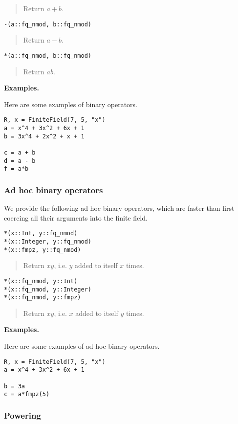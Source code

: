 \documentclass[a4paper,10pt]{article}
\newcommand{\desc}[1]{\vspace{-3mm}\begin{quote}#1\end{quote}}
\begin{document}
{{\desc{Return $a + b$.}

\begin{lstlisting}
-(a::fq_nmod, b::fq_nmod)
\end{lstlisting}

\desc{Return $a - b$.}

\begin{lstlisting}
*(a::fq_nmod, b::fq_nmod)
\end{lstlisting}

\desc{Return $ab$.}

\textbf{Examples.}

Here are some examples of binary operators.

\begin{lstlisting}
R, x = FiniteField(7, 5, "x")
a = x^4 + 3x^2 + 6x + 1
b = 3x^4 + 2x^2 + x + 1

c = a + b
d = a - b
f = a*b
\end{lstlisting}

\subsubsection{Ad hoc binary operators}

We provide the following ad hoc binary operators, which are faster than first
coercing all their arguments into the finite field.

\begin{lstlisting}
*(x::Int, y::fq_nmod)
*(x::Integer, y::fq_nmod)
*(x::fmpz, y::fq_nmod)
\end{lstlisting}

\desc{Return $xy$, i.e. $y$ added to itself $x$ times.}

\begin{lstlisting}
*(x::fq_nmod, y::Int)
*(x::fq_nmod, y::Integer)
*(x::fq_nmod, y::fmpz)
\end{lstlisting}

\desc{Return $xy$, i.e. $x$ added to itself $y$ times.}

\textbf{Examples.}

Here are some examples of ad hoc binary operators.

\begin{lstlisting}
R, x = FiniteField(7, 5, "x")
a = x^4 + 3x^2 + 6x + 1

b = 3a
c = a*fmpz(5)
\end{lstlisting}

\subsubsection{Powering}

}}
\end{document}
